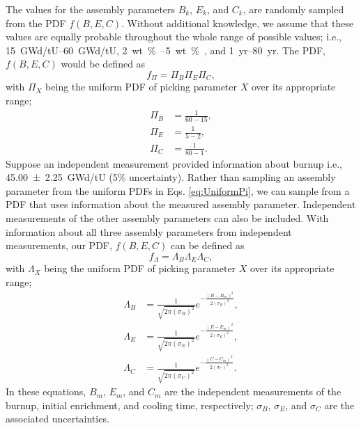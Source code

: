 \documentclass{ansnse}
\begin{document}
The values for the assembly parameters $B_{k}$, $E_{k}$, and $C_{k}$, are randomly sampled from the PDF $f(B,E,C)$.  Without additional knowledge, we assume that these values are equally probable throughout the whole range of possible values; i.e., \SIrange{15}{60}{GWd/tU}, \SIrange{2}{5}{wt \% }, and \SIrange{1}{80}{yr}.  The PDF, $f(B,E,C)$ would be defined as
\begin{equation}
    f_{\Pi} = \Pi_{B}\Pi_{E}\Pi_{C},
    \label{eq:UniformPDF}
\end{equation}
with $\Pi_{X}$ being the uniform PDF of picking parameter $X$ over its appropriate range;
\begin{subequations}
    \label{eq:UniformPi}
    \begin{align}
        \Pi_{B} &= \frac{1}{60-15}, \\
        \Pi_{E} &= \frac{1}{5-2}, \\
        \Pi_{C} &= \frac{1}{80-1}.
    \end{align}
\end{subequations}
Suppose an independent measurement provided information about burnup i.e., \SI{45.00(225)}{GWd/tU} (5\% uncertainty).  Rather than sampling an assembly parameter from the uniform PDFs in Eqs. \eqref{eq:UniformPi}, we can sample from a PDF that uses information about the measured assembly parameter.  Independent measurements of the other assembly parameters can also be included.  With information about all three assembly parameters from independent measurements, our PDF, $f(B,E,C)$ can be defined as
\begin{equation}
    f_{\Lambda} = \Lambda_{B}\Lambda_{E}\Lambda_{C},
    \label{eq:GaussianPDF}
\end{equation}
with $\Lambda_{X}$ being the uniform PDF of picking parameter $X$ over its appropriate range;
\begin{subequations}
    \label{eq:GaussianLambda}
    \begin{align}
        \Lambda_{B} &= \frac{1}{\sqrt{2\pi \left(\sigma_{B}\right)^{2}}} e^{-\frac{\left(B-B_{m}\right)^{2}}{2 \left(\sigma_{B}\right)^{2}}}, \\
        \Lambda_{E} &= \frac{1}{\sqrt{2\pi \left(\sigma_{E}\right)^{2}}} e^{-\frac{\left(E-E_{m}\right)^{2}}{2 \left(\sigma_{E}\right)^{2}}}, \\
        \Lambda_{C} &= \frac{1}{\sqrt{2\pi \left(\sigma_{C}\right)^{2}}} e^{-\frac{\left(C-C_{m}\right)^{2}}{2 \left(\sigma_{C}\right)^{2}}}.
    \end{align}
\end{subequations}
In these equations, $B_{m}$, $E_{m}$, and $C_{m}$ are the independent measurements of the burnup, initial enrichment, and cooling time, respectively; $\sigma_{B}$, $\sigma_{E}$, and $\sigma_{C}$ are the associated uncertainties.  
\end{document}
